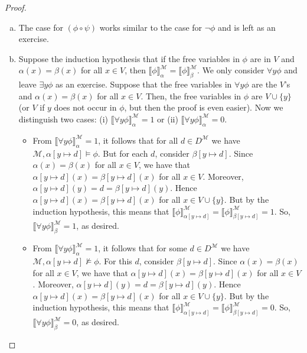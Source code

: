 \begin{enumerate}[\thesection.1]
\begin{proof}
\begin{enumerate}[(i)]
\begin{enumerate}[(a)]
			\item The case for $(\phi\circ \psi)$ works similar to the case for $\neg\phi$ and is left as an exercise.
			
			\item Suppose the induction hypothesis that if the free variables in $\phi$ are in $V$ and $\alpha(x)=\beta(x)$ for all $x\in V$, then $\llbracket\phi\rrbracket_\alpha^\mathcal{M}=\llbracket\phi\rrbracket_\beta^\mathcal{M}$. We only consider $\forall y\phi$ and leave $\exists y\phi$ as an exercise. Suppose that the free variables in $\forall y\phi$ are the $V$'s and $\alpha(x)=\beta(x)$ for all $x\in V$. Then, the free variables in $\phi$ are $V\cup\{y\}$ (or $V$ if $y$ does not occur in $\phi$, but then the proof is even easier). Now we distinguish two cases: (i) $\llbracket\forall y\phi\rrbracket_\alpha^\mathcal{M}=1$ or (ii)  $\llbracket\forall y\phi\rrbracket_\alpha^\mathcal{M}=0$. 
			
			\begin{itemize}
			
				\item From $\llbracket\forall y\phi\rrbracket_\alpha^\mathcal{M}=1$, it follows that for all $d\in D^\mathcal{M}$ we have $\mathcal{M},\alpha[y\mapsto d]\vDash\phi$. But for each $d$, consider $\beta[y\mapsto d]$. Since $\alpha(x)=\beta(x)$ for all $x\in V$, we have that $\alpha[y\mapsto d](x)=\beta[y\mapsto d](x)$ for all $x\in V$. Moreover, $\alpha[y\mapsto d](y)=d=\beta[y\mapsto d](y)$. Hence $\alpha[y\mapsto d](x)=\beta[y\mapsto d](x)$ for all $x\in V\cup\{y\}$. But by the induction hypothesis, this means that $\llbracket\phi\rrbracket_{\alpha[y\mapsto d]}^\mathcal{M}=\llbracket\phi\rrbracket_{\beta[y\mapsto d]}^\mathcal{M}=1$. So, $\llbracket\forall y\phi\rrbracket_\beta^\mathcal{M}=1$, as desired.
				
				\item  From $\llbracket\forall y\phi\rrbracket_\alpha^\mathcal{M}=1$, it follows that for some $d\in D^\mathcal{M}$ we have $\mathcal{M},\alpha[y\mapsto d]\nvDash\phi$. For this $d$, consider $\beta[y\mapsto d]$. Since $\alpha(x)=\beta(x)$ for all $x\in V$, we have that $\alpha[y\mapsto d](x)=\beta[y\mapsto d](x)$ for all $x\in V$. Moreover, $\alpha[y\mapsto d](y)=d=\beta[y\mapsto d](y)$. Hence $\alpha[y\mapsto d](x)=\beta[y\mapsto d](x)$ for all $x\in V\cup\{y\}$. But by the induction hypothesis, this means that $\llbracket\phi\rrbracket_{\alpha[y\mapsto d]}^\mathcal{M}=\llbracket\phi\rrbracket_{\beta[y\mapsto d]}^\mathcal{M}=0$. So, $\llbracket\forall y\phi\rrbracket_\beta^\mathcal{M}=0$, as desired.
				

\end{itemize}
\end{enumerate}
\end{enumerate}
\end{proof}
\end{enumerate}
